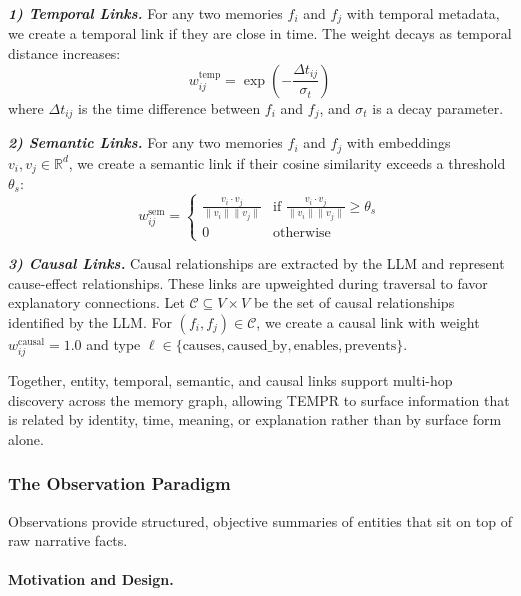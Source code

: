 \textbf{\textit{1) Temporal Links.}} For any two memories $f_i$ and $f_j$ with temporal metadata, we create a temporal link if they are close in time. The weight decays as temporal distance increases:
\begin{equation}
w_{ij}^{\text{temp}} = \exp\left(-\frac{\Delta t_{ij}}{\sigma_t}\right)
\end{equation}
where $\Delta t_{ij}$ is the time difference between $f_i$ and $f_j$, and $\sigma_t$ is a decay parameter.

\textbf{\textit{2) Semantic Links.}} For any two memories $f_i$ and $f_j$ with embeddings $v_i, v_j \in \mathbb{R}^d$, we create a semantic link if their cosine similarity exceeds a threshold $\theta_s$:
\begin{equation}
w_{ij}^{\text{sem}} = \begin{cases}
\frac{v_i \cdot v_j}{\|v_i\| \|v_j\|} & \text{if } \frac{v_i \cdot v_j}{\|v_i\| \|v_j\|} \geq \theta_s \\
0 & \text{otherwise}
\end{cases}
\end{equation}

\textbf{\textit{3) Causal Links.}} Causal relationships are extracted by the LLM and represent cause-effect relationships. These links are upweighted during traversal to favor explanatory connections. Let $\mathcal{C} \subseteq V \times V$ be the set of causal relationships identified by the LLM. For $(f_i, f_j) \in \mathcal{C}$, we create a causal link with weight $w_{ij}^{\text{causal}} = 1.0$ and type $\ell \in \{\text{causes}, \text{caused\_by}, \text{enables}, \text{prevents}\}$.

Together, entity, temporal, semantic, and causal links support multi-hop discovery across the memory graph, allowing TEMPR to surface information that is related by identity, time, meaning, or explanation rather than by surface form alone.

\subsubsection{The Observation Paradigm}

Observations provide structured, objective summaries of entities that sit on top of raw narrative facts.

\paragraph{Motivation and Design.}

